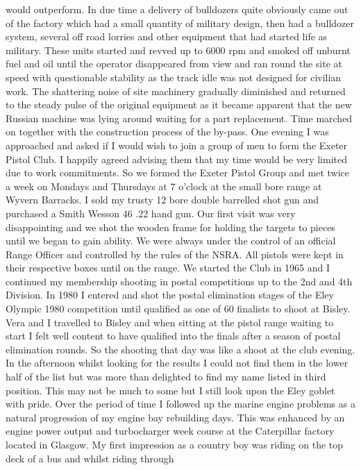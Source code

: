 would outperform.  In due time a delivery of bulldozers quite obviously came
out of the factory which had a small quantity of military design, then had a
bulldozer system, several off road lorries and other equipment that had started
life as military.  These units started and revved up to 6000 rpm and smoked off
unburnt fuel and oil until the operator disappeared from view and ran round the
site at speed with questionable stability as the track idle was not designed
for civilian work.  The shattering noise of site machinery gradually diminished
and returned to the steady pulse of the original equipment as it became
apparent that the new Russian machine was lying around waiting for a part
replacement.  Time marched on together with the construction process of the
by-pass. One evening I was approached and asked if I would wish to join a group
of men to form the Exeter Pistol Club.  I happily agreed advising them that my
time would be very limited due to work commitments.  So we formed the Exeter
Pistol Group and met twice a week on Mondays and Thursdays at 7 o'clock at the
small bore range at Wyvern Barracks.  I sold my trusty 12 bore double barrelled
shot gun and purchased a Smith Wesson 46 .22 hand gun.  Our first visit was
very disappointing and we shot the wooden frame for holding the targets to
pieces until we began to gain ability.  We were always under the control of an
official Range Officer and controlled by the rules of the NSRA.  All pistols
were kept in their respective boxes until on the range. We started the Club in
1965 and I continued my membership shooting in postal competitions up to the
2nd and 4th Division.  In 1980 I entered and shot the postal elimination stages
of the Eley Olympic 1980 competition until qualified as one of 60 finalists to
shoot at Bisley. Vera and I travelled to Bisley and when sitting at the pistol
range waiting to start I felt well content to have qualified into the finals
after a season of postal elimination rounds.  So the shooting that day was like
a shoot at the club evening.  In the afternoon whilst looking for the results I
could not find them in the lower half of the list but was more than delighted
to find my name listed in third position.  This may not be much to some but I
still look upon the Eley goblet with pride.  Over the period of time I followed
up the marine engine problems as a natural progression of my engine bay
rebuilding days.  This was enhanced by an engine power output and turbocharger
week course at the Caterpillar factory located in Glasgow.  My first impression
as a country boy was riding on the top deck of a bus and whilst riding through
